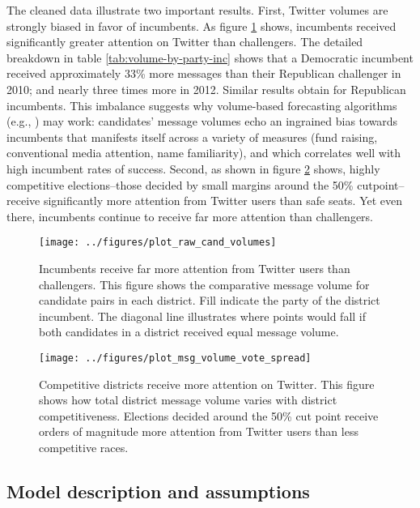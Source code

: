 \documentclass{sig-alternate-2013}
\begin{document}
The cleaned data illustrate two important results. First, Twitter volumes
are strongly biased in favor of incumbents. As figure
\ref{fig:cand-msg-volume} shows, incumbents received significantly
greater attention on Twitter than challengers.  The detailed breakdown
in table \ref{tab:volume-by-party-inc} shows that a Democratic
incumbent received approximately 33\% more messages than their
Republican challenger in 2010; and nearly three times more in
2012. Similar results obtain for Republican incumbents. This imbalance
suggests why volume-based forecasting algorithms (e.g.,
\cite{tumasjan2010election,bermingham2011using}) may work: candidates'
message volumes echo an ingrained bias towards incumbents that
manifests itself across a variety of measures (fund raising,
conventional media attention, name familiarity), and which
correlates well with high incumbent rates of success. Second, as shown
in figure \ref{fig:msg-volume-vote-spread} shows, highly competitive
elections--those decided by small margins around the 50\%
cutpoint--receive significantly more attention from Twitter users than
safe seats. Yet even there, incumbents continue to receive far more
attention than challengers. 

\begin{figure}[ht]
  \centering
  \texttt{[image: ../figures/plot\_raw\_cand\_volumes]}
  \caption{Incumbents receive far more attention from Twitter users
    than challengers. This figure shows the comparative message volume for
    candidate pairs in each district. Fill indicate the party of the
    district incumbent. The diagonal line illustrates where points would fall if both candidates in a district received equal message volume.}
  \label{fig:cand-msg-volume}
\end{figure}


\begin{figure}[ht]
  \centering
  \texttt{[image: ../figures/plot\_msg\_volume\_vote\_spread]}
  \caption{Competitive districts receive more attention on
    Twitter. This figure shows how total district message volume
    varies with district competitiveness. Elections decided around the
  50\% cut point receive orders of magnitude more attention from
  Twitter users than less competitive races.}
  \label{fig:msg-volume-vote-spread}
\end{figure}


\subsection{Model description and assumptions}
\label{sec:model-descr-assumpt}
\end{document}
